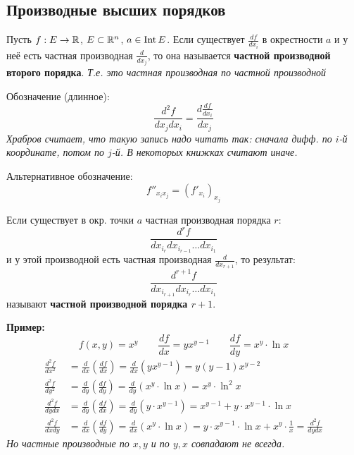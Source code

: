 \subsection{Производные высших порядков}

\begin{conj}
    Пусть $f : E \to \mathbb{R}$, $E \subset \mathbb{R}^n$, $a \in \operatorname{Int} E$.
    Если существует $\frac{df}{d x_i}$ в окрестности $a$
    и у неё есть частная производная $\frac{d}{d x_j}$,
    то она называется \textbf{частной производной второго порядка}.
    \textit{Т.е. это частная производная по частной производной}

    Обозначение (длинное):
    $$\frac{d^2 f}{d x_j d x_i} = \frac{d \frac{d f}{d x_i}}{d x_j}$$
    \textit{Храбров считает, что такую запись надо читать так:
    сначала дифф. по $i$-й координате, потом по $j$-й. В некоторых
    книжках считают иначе.}

    Альтернативное обозначение:
    $$f''_{x_i x_j} = (f'_{x_i})_{x_j}$$
\end{conj}

\begin{conj}
    Если существует в окр. точки $a$ частная производная порядка $r$:
    $$ \frac{d^r f}{d x_{i_r} d x_{i_{r-1}} \dots d x_{i_1}} $$
    и у этой производной есть частная производная $\frac{d}{d x_{r+1}}$,
    то результат:
    $$ \frac{d^{r+1} f}{d x_{i_{r+1}} d x_{i_{r}} \dots d x_{i_1}} $$
    называют \textbf{частной производной порядка $r+1$}.
\end{conj}

\textbf{Пример:}
$$f(x, y) = x^y \quad\quad \frac{df}{dx} = y x^{y - 1} 
\quad\quad \frac{df}{dy} = x^y \cdot \ln x$$
\begin{align*}
    \frac{d^2 f}{d x^2} &= \frac{d}{dx} \left( \frac{df}{dx} \right)
    = \frac{d}{dx} \left( y x^{y - 1} \right) = y(y-1) x^{y-2} \\
    \frac{d^2 f}{d y^2} &= \frac{d}{dy} \left( \frac{df}{dy} \right)
    = \frac{d}{dy} \left( x^y \cdot \ln x \right) = x^y \cdot \ln^2 x \\
    \frac{d^2 f}{d y d x} &= \frac{d}{dy} \left( \frac{df}{dx} \right)
    = \frac{d}{dy} \left( y \cdot x^{y - 1} \right) = x^{y-1} + 
    y \cdot x^{y-1} \cdot \ln x \\
    \frac{d^2 f}{d x d y} &= \frac{d}{dx} \left( \frac{df}{dy} \right)
    = \frac{d}{dx} \left( x^y \cdot \ln x \right) =
    y \cdot x^{y - 1} \cdot \ln x + x^y \cdot \frac{1}{x} =
    \frac{d^2 f}{d y d x}
\end{align*}
\textit{Но частные производные по $x,y$ и по $y,x$ совпадают не всегда.}

